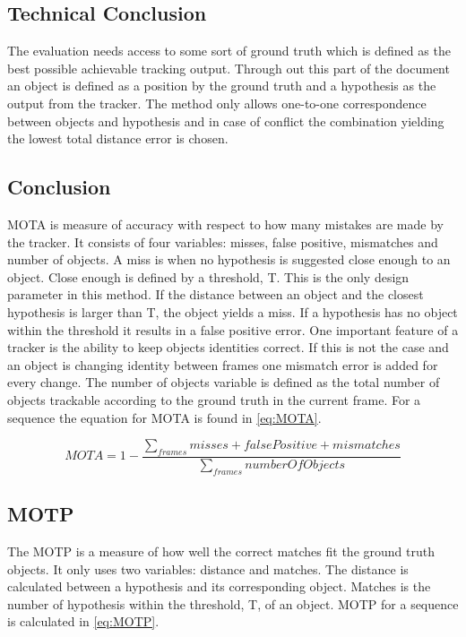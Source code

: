 \subsection{Technical Conclusion}
The evaluation needs access to some sort of ground truth which is defined as the best possible achievable tracking output. Through out this part of the document an object is defined as a position by the ground truth and a hypothesis as the output from the tracker. The method only allows one-to-one correspondence between objects and hypothesis and in case of conflict the combination yielding the lowest total distance error is chosen.

\subsection{Conclusion}
MOTA is measure of accuracy with respect to how many mistakes are made by the tracker. It consists of four variables: misses, false positive, mismatches and number of objects. A miss is when no hypothesis is suggested close enough to an object. Close enough is defined by a threshold, T. This is the only design parameter in this method. If the distance between an object and the closest hypothesis is larger than T, the object yields a miss. If a hypothesis has no object within the threshold it results in a false positive error. One important feature of a tracker is the ability to keep objects identities correct. If this is not the case and an object is changing identity between frames one mismatch error is added for every change. The number of objects variable is defined as the total number of objects trackable according to the ground truth in the current frame. For a sequence the equation for MOTA is found in \eqref{eq:MOTA}.

\begin{equation}
\label{eq:MOTA}
MOTA = 1 - \frac{\sum_{frames}{misses + false Positive + mismatches}}{\sum_{frames}{number Of Objects}}
\end{equation}	

\subsection{MOTP}
The MOTP is a measure of how well the correct matches fit the ground truth objects. It only uses two variables: distance and matches. The distance is calculated between a hypothesis and its corresponding object. Matches is the number of hypothesis within the 
threshold, T, of an object. MOTP for a sequence is calculated in \eqref{eq:MOTP}.


